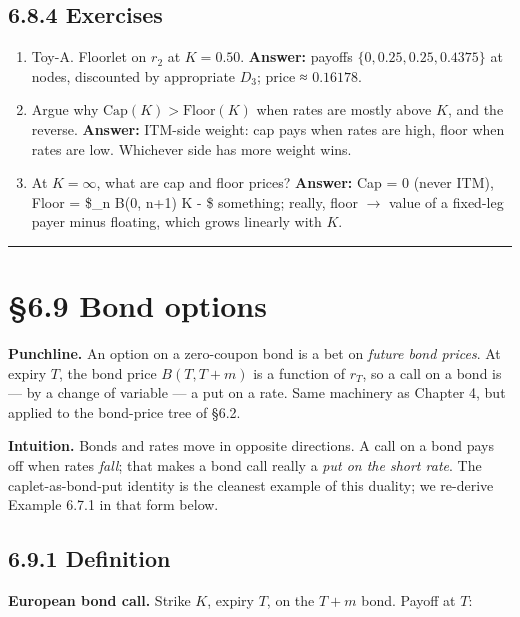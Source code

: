 \documentclass[
  10pt,
  twoside]{book}
\providecommand{\tightlist}{%
  \setlength{\itemsep}{0pt}\setlength{\parskip}{0pt}}
\begin{document}
\subsection{6.8.4 Exercises}\label{exercises-34}

\begin{enumerate}
\def\labelenumi{\arabic{enumi}.}
\tightlist
\item
  Toy-A. Floorlet on \(r_2\) at \(K = 0.50\). \textbf{Answer:} payoffs
  \(\{0, 0.25, 0.25, 0.4375\}\) at nodes, discounted by appropriate
  \(D_3\); price ≈ \(0.16178\).
\item
  Argue why \(\text{Cap}(K) > \text{Floor}(K)\) when rates are mostly
  above \(K\), and the reverse. \textbf{Answer:} ITM-side weight: cap
  pays when rates are high, floor when rates are low. Whichever side has
  more weight wins.
\item
  At \(K = \infty\), what are cap and floor prices? \textbf{Answer:} Cap
  = 0 (never ITM), Floor = \$\sum\_n B(0, n+1) \cdot K - \$ something;
  really, floor \(\to\) value of a fixed-leg payer minus floating, which
  grows linearly with \(K\).
\end{enumerate}

\begin{center}\rule{0.5\linewidth}{0.5pt}\end{center}

\section{§6.9 Bond options}\label{bond-options}

\textbf{Punchline.} An option on a zero-coupon bond is a bet on
\emph{future bond prices}. At expiry \(T\), the bond price \(B(T, T+m)\)
is a function of \(r_T\), so a call on a bond is --- by a change of
variable --- a put on a rate. Same machinery as Chapter 4, but applied
to the bond-price tree of §6.2.

\textbf{Intuition.} Bonds and rates move in opposite directions. A call
on a bond pays off when rates \emph{fall}; that makes a bond call really
a \emph{put on the short rate}. The caplet-as-bond-put identity is the
cleanest example of this duality; we re-derive Example 6.7.1 in that
form below.

\subsection{6.9.1 Definition}\label{definition-1}

\textbf{European bond call.} Strike \(K\), expiry \(T\), on the \(T+m\)
bond. Payoff at \(T\):
\end{document}
